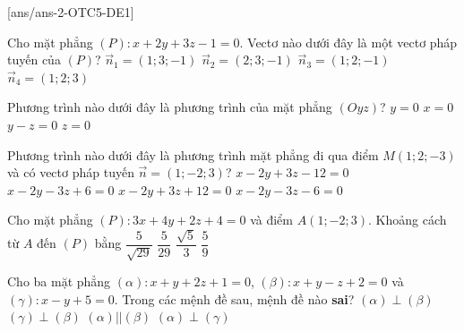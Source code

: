[ans/ans-2-OTC5-DE1]
\caulc
\begin{ex}%
	Cho mặt phẳng $(P)\colon x+2 y+3 z-1=0$. Vectơ nào dưới đây là một vectơ pháp tuyến của $(P)$?
	\choice
	{$\overrightarrow{n}_1=(1 ; 3 ;-1)$}
	{$\overrightarrow{n}_2=(2 ; 3 ;-1)$}
	{$\overrightarrow{n}_3=(1 ; 2 ;-1)$}
	{\True $\overrightarrow{n}_4=(1 ; 2 ; 3)$}
\end{ex}
\begin{ex}%
	Phương trình nào dưới đây là phương trình của mặt phẳng $(Oyz)$?
	\choice
	{$y=0$}
	{\True $x=0$}
	{$y-z=0$}
	{$z=0$}
\end{ex}
\begin{ex}%
	Phương trình nào dưới đây là phương trình mặt phẳng đi qua điểm $M(1 ; 2 ;-3)$ và có vectơ pháp tuyến $\overrightarrow{n}=(1 ;-2 ; 3)$?
	\choice
	{$x-2 y+3 z-12=0$}
	{$x-2 y-3 z+6=0$}
	{\True $x-2 y+3 z+12=0$}
	{$x-2 y-3 z-6=0$}
\end{ex}
\begin{ex}%
	Cho mặt phẳng $(P)\colon 3 x+4 y+2 z+4=0$ và điểm $A(1 ;-2 ; 3)$. Khoảng cách từ $A$ đến $(P)$ bằng
	\choice
	{\True $\dfrac{5}{\sqrt{29}}$}
	{$\dfrac{5}{29}$}
	{$\dfrac{\sqrt{5}}{3}$}
	{$\dfrac{5}{9}$}
\end{ex}
\begin{ex}%
	Cho ba mặt phẳng $(\alpha)\colon x+y+2 z+1=0$, $(\beta)\colon x+y-z+2=0$ và $(\gamma)\colon x-y+5=0$. Trong các mệnh đề sau, mệnh đề nào \textbf{sai}?
	\choice
	{$(\alpha) \perp(\beta)$}
	{$(\gamma) \perp(\beta)$}
	{\True $(\alpha) || (\beta)$}
	{$(\alpha) \perp(\gamma)$}
\end{ex}
